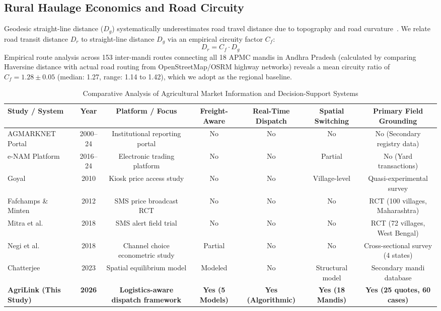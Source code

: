 \documentclass[journal]{IEEEtran}
\begin{document}
\subsection{Rural Haulage Economics and Road Circuity}
Geodesic straight-line distance ($D_g$) systematically underestimates road travel distance due to topography and road curvature~\cite{ballou2002selected, boscoe2012nationwide}. We relate road transit distance $D_r$ to straight-line distance $D_g$ via an empirical circuity factor $C_f$:
\begin{equation}
D_r = C_f \cdot D_g
\label{eq:circuity}
\end{equation}
Empirical route analysis across 153 inter-mandi routes connecting all 18 APMC mandis in Andhra Pradesh (calculated by comparing Haversine distance with actual road routing from OpenStreetMap/OSRM highway networks) reveals a mean circuity ratio of $C_f = 1.28 \pm 0.05$ (median: 1.27, range: 1.14 to 1.42), which we adopt as the regional baseline.

\begin{table}[t]
\caption{Comparative Analysis of Agricultural Market Information and Decision-Support Systems}
\label{tab:lit}
\centering
\begin{tabular}{lcccccc}
\toprule
\textbf{Study / System} & \textbf{Year} & \textbf{Platform / Focus} & \textbf{Freight-Aware} & \textbf{Real-Time Dispatch} & \textbf{Spatial Switching} & \textbf{Primary Field Grounding} \\
\midrule
AGMARKNET Portal~\cite{agmarknet2024} & 2000--24 & Institutional reporting portal & No & No & No & No (Secondary registry data) \\
e-NAM Platform~\cite{sekhar2021agricultural} & 2016--24 & Electronic trading platform & No & No & Partial & No (Yard transactions) \\
Goyal~\cite{goyal2010information} & 2010 & Kiosk price access study & No & No & Village-level & Quasi-experimental survey \\
Fafchamps \& Minten~\cite{fafchamps2012impact} & 2012 & SMS price broadcast RCT & No & No & No & RCT (100 villages, Maharashtra) \\
Mitra et al.~\cite{mitra2018asymmetric} & 2018 & SMS alert field trial & No & No & No & RCT (72 villages, West Bengal) \\
Negi et al.~\cite{negi2018farmers} & 2018 & Channel choice econometric study & Partial & No & No & Cross-sectional survey (4 states) \\
Chatterjee~\cite{chatterjee2023market} & 2023 & Spatial equilibrium model & Modeled & No & Structural model & Secondary mandi database \\
\textbf{AgriLink (This Study)} & \textbf{2026} & \textbf{Logistics-aware dispatch framework} & \textbf{Yes (5 Models)} & \textbf{Yes (Algorithmic)} & \textbf{Yes (18 Mandis)} & \textbf{Yes (25 quotes, 60 cases)} \\
\bottomrule
\end{tabular}
\end{table}
\end{document}
